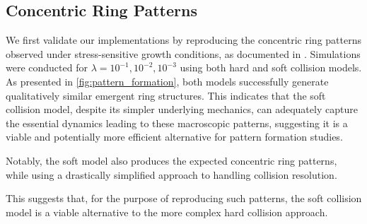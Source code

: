 \documentclass[conference]{IEEEtran}
\newlength{\subfigwidth}
\newcommand{\growthcomparisonrow}[6]{%
    #1 &
    \begin{subfigure}[b]{\subfigwidth}
        \texttt{[image: figures/growth\_comparison\_lambda\_\#2/\#1.\#3.png]}
    \end{subfigure} &
    \begin{subfigure}[b]{\subfigwidth}
        \texttt{[image: figures/growth\_comparison\_lambda\_\#2/\#1.\#4.png]}
    \end{subfigure} &
    \begin{subfigure}[b]{\subfigwidth}
        \texttt{[image: figures/growth\_comparison\_lambda\_\#2/\#1.\#5.png]}
    \end{subfigure} &
    \begin{subfigure}[b]{\subfigwidth}
        \texttt{[image: figures/growth\_comparison\_lambda\_\#2/\#1.\#6.png]}
    \end{subfigure}  \\
}
\begin{document}
\subsection{Concentric Ring Patterns}

We first validate our implementations by reproducing the concentric ring patterns observed under stress-sensitive growth conditions, as documented in \cite{Weady2024}. Simulations were conducted for $\lambda = 10^{-1}, 10^{-2}, 10^{-3}$ using both hard and soft collision models. As presented in \autoref{fig:pattern_formation}, both models successfully generate qualitatively similar emergent ring structures. This indicates that the soft collision model, despite its simpler underlying mechanics, can adequately capture the essential dynamics leading to these macroscopic patterns, suggesting it is a viable and potentially more efficient alternative for pattern formation studies.


Notably, the soft model also produces the expected concentric ring patterns, while using a drastically simplified approach to handling collision resolution.

This suggests that, for the purpose of reproducing such patterns, the soft collision model is a viable alternative to the more complex hard collision approach.



\end{document}
